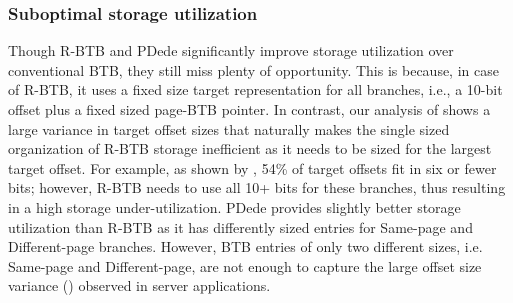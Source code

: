 \subsubsection{Suboptimal storage utilization} Though R-BTB and PDede significantly improve storage utilization over conventional BTB, they still miss plenty of opportunity. This is because, in case of R-BTB, it uses a fixed size target representation for all branches, i.e., a 10-bit offset plus a fixed sized page-BTB pointer. In contrast, our analysis of  shows a large variance in target offset sizes that naturally makes the single sized organization of R-BTB storage inefficient as it needs to be sized for the largest target offset. For example, as shown by , 54\% of target offsets fit in six or fewer bits; however, R-BTB needs to use all 10+ bits for these branches, thus resulting in a high storage under-utilization. PDede provides slightly better storage utilization than R-BTB as it has differently sized entries for Same-page and Different-page branches. However, BTB entries of only two different sizes, i.e. Same-page and Different-page, are not enough to capture the large offset size variance () observed in server applications.

